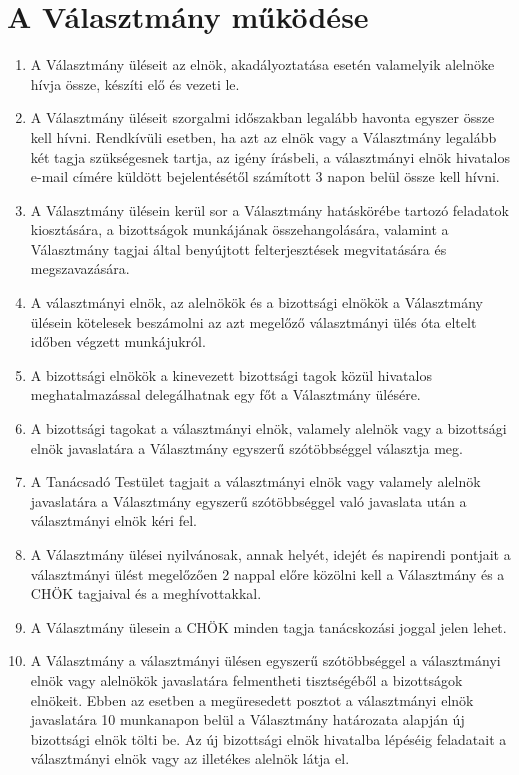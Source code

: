 \documentclass{../styles/rulebook}
\begin{document}
\section{A Választmány működése}

\begin{enumerate}
	\item A Választmány üléseit az elnök, akadályoztatása esetén valamelyik alelnöke hívja össze, készíti elő és vezeti le.
	\item A Választmány üléseit szorgalmi időszakban legalább havonta egyszer össze kell hívni. Rendkívüli esetben, ha azt az elnök vagy a Választmány legalább két tagja szükségesnek tartja, az igény írásbeli, a választmányi elnök hivatalos e-mail címére küldött bejelentésétől számított 3 napon belül össze kell hívni.
	\item A Választmány ülésein kerül sor a Választmány hatáskörébe tartozó feladatok kiosztására, a bizottságok munkájának összehangolására, valamint a Választmány tagjai által benyújtott felterjesztések megvitatására és megszavazására.
	\item A választmányi elnök, az alelnökök és a bizottsági elnökök a Választmány ülésein kötelesek beszámolni az azt megelőző választmányi ülés óta eltelt időben végzett munkájukról.
	\item A bizottsági elnökök a kinevezett bizottsági tagok közül hivatalos meghatalmazással delegálhatnak egy főt a Választmány ülésére.
	\item A bizottsági tagokat a választmányi elnök, valamely alelnök vagy a bizottsági elnök javaslatára a Választmány egyszerű szótöbbséggel választja meg.
	\item A Tanácsadó Testület tagjait a választmányi elnök vagy valamely alelnök javaslatára a Választmány egyszerű szótöbbséggel való javaslata után a választmányi elnök kéri fel.
	\item A Választmány ülései nyilvánosak, annak helyét, idejét és napirendi pontjait a választmányi ülést megelőzően 2 nappal előre közölni kell a Választmány és a CHÖK tagjaival és a meghívottakkal.
	\item A Választmány ülesein a CHÖK minden tagja tanácskozási joggal jelen lehet.
	\item A Választmány a választmányi ülésen egyszerű szótöbbséggel a választmányi elnök vagy alelnökök javaslatára felmentheti tisztségéből a bizottságok elnökeit. Ebben az esetben a megüresedett posztot a választmányi elnök javaslatára 10 munkanapon belül a Választmány határozata alapján új bizottsági elnök tölti be. Az új bizottsági elnök hivatalba lépéséig feladatait a választmányi elnök vagy az illetékes alelnök látja el.

\end{enumerate}
\end{document}
